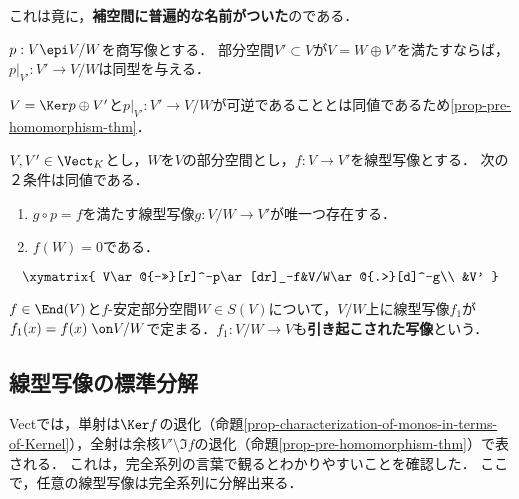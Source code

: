 \documentclass[uplatex, dvipdfmx]{jsreport}
\begin{document}
\begin{tcolorbox}[colframe=ForestGreen, colback=ForestGreen!10!white,breakable,colbacktitle=ForestGreen!40!white,coltitle=black,fonttitle=\bfseries\sffamily,
title=]
    これは竟に，\textbf{補空間に普遍的な名前がついた}のである．
\end{tcolorbox}

\begin{proposition}[全ての補空間は商空間に同型]
    $p:V\epi V/W$を商写像とする．
    部分空間$V'\subset V$が$V=W\oplus V'$を満たすならば，$p|_{V'}:V'\to V/W$は同型を与える．
\end{proposition}
\begin{Proof}
    $V=\Ker p\oplus V'$と$p|_{V'}:V'\to V/W$が可逆であることとは同値であるため\ref{prop-pre-homomorphism-thm}．
\end{Proof}

\begin{proposition}[商空間の普遍性]\label{prop-universality-of-quotient-spaces}
    $V,V'\in\Vect_K$とし，$W$を$V$の部分空間とし，$f:V\to V'$を線型写像とする．
    次の２条件は同値である．
    \begin{enumerate}
        \item $g\circ p=f$を満たす線型写像$g:V/W\to V'$が唯一つ存在する．
        \item $f(W)=0$である．
    \end{enumerate}
    \[\xymatrix{
        V\ar@{->>}[r]^-p\ar[dr]_-f&V/W\ar@{.>}[d]^-g\\
        &V'
    }\]
\end{proposition}
\begin{remarks}
    $f\in\End(V)$と$f$-安定部分空間$W\in S(V)$について，$V/W$上に線型写像$f_1$が$f_1(x)=f(x)\;\on V/W$で定まる．$f_1:V/W\to V$も\textbf{引き起こされた写像}という．
\end{remarks}

\subsection{線型写像の標準分解}

\begin{tcolorbox}[colframe=ForestGreen, colback=ForestGreen!10!white,breakable,colbacktitle=ForestGreen!40!white,coltitle=black,fonttitle=\bfseries\sffamily,
title=線型写像の準同型定理は，任意の線型写像を完全系列に分解する]
    Vectでは，単射は$\Ker f$の退化（命題\ref{prop-characterization-of-monos-in-terms-of-Kernel}），全射は余核$V'\setminus\Im f$の退化（命題\ref{prop-pre-homomorphism-thm}）で表される．
    これは，完全系列の言葉で観るとわかりやすいことを確認した．
    ここで，任意の線型写像は完全系列に分解出来る．
\end{tcolorbox}
\end{document}
